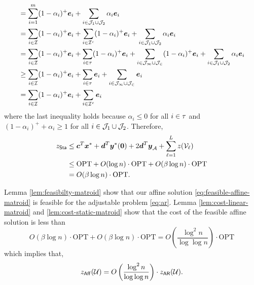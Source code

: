 \documentclass[moor]{informs1}              %
\newcommand{\opt}{\mathrm{OPT}}
\newcommand{\mb}[1]{\ensuremath{\boldsymbol{#1}}}
\begin{document}
{\begin{align*}
&= \sum_{i=1}^m (1-\alpha_i)^+ \mb e_i  + \sum_{i \in {\cal J}_{1} \cup  {\cal J}_{2}  } \alpha_i \mb e_i \\
&= \sum_{i \in {\cal I}}   (1-\alpha_i)^+ \mb e_i +\sum_{i \in {\cal I}^c}   (1-\alpha_i)^+ \mb e_i + \sum_{i \in {\cal J}_{1} \cup  {\cal J}_{2}  } \alpha_i \mb e_i \\
&=    \sum_{i \in {\cal I}}     (1-\alpha_i)^+ \mb e_i+ \sum_{i \in {\cal \tau}}    (1-\alpha_i)^+ \mb e_i  +  \sum_{i \in {\cal J_1}  \cup {\cal J_2} }     (1-\alpha_i)^+ \mb e_i + \sum_{i \in {\cal J}_{1} \cup  {\cal J}_{2}  } \alpha_i \mb e_i \\
& \geq    \sum_{i \in {\cal I}}     (1-\alpha_i)^+ \mb e_i+ \sum_{i \in {\cal \tau}}     \mb e_i  +  \sum_{i \in {\cal J_1}  \cup {\cal J_2} }      \mb e_i \\
& =  \sum_{i \in {\cal I}}    (1-\alpha_i)^+ \mb e_i  +   \sum_{i \in {\cal I}^c}      \mb e_i
\end{align*}
where the last inequality holds because $ \alpha_i \leq 0 $ for all $ i \in {\cal \tau}$ and $   (1-\alpha_i)^+ + \alpha_i \geq 1$ for all $ i \in  {\cal J}_1 \cup {\cal J}_2$.
Therefore,
\begin{align*}
z_{\sf Sta} &\leq  \mb c^T \mb x^*+ \mb d^T \mb y^*(\mb 0)+ 2 \mb d^T \mb y_{\cal A} + \sum_{\ell=1}^L z({\cal V}_{\ell})   \\
&\leq  \opt+ O(\log n ) \cdot \opt+ O( \beta \log n )  \cdot \opt \\
& = O( \beta\log n) \cdot \opt.
\end{align*} 
\hfill
\Halmos
\endproof
}

Lemma \ref{lem:feasibilty-matroid} show that our affine solution \eqref{eq:feasible-affine-matroid} is feasible for the adjustable problem \eqref{eq:ar}. Lemma \ref{lem:cost-linear-matroid} and \ref{lem:cost-static-matroid} show that  the cost of the feasible affine solution is less than
$$O(\beta \log n)\cdot \opt +O(\beta \log n)\cdot \opt =O \left( \frac{\log^2 n}{\log \log n} \right) \cdot \opt $$ which implies that, $$ z_{\sf Aff}({\cal U}) = O \left( \frac{\log^2 n}{\log \log n} \right)\cdot z_{\sf AR}({\cal U}).$$
\hfill
\Halmos
\endproof
\end{document}
